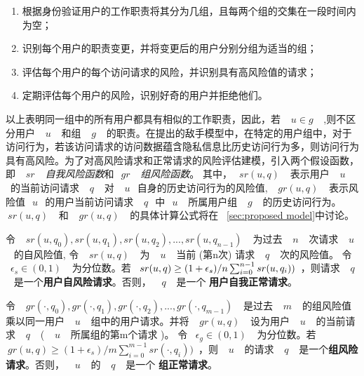 \begin{enumerate}
	\item 根据身份验证用户的工作职责将其分为几组，且每两个组的交集在一段时间内为空；
	\item 识别每个用户的职责变更，并将变更后的用户分别分组为适当的组；
	\item 评估每个用户的每个访问请求的风险，并识别具有高风险值的请求；
	\item 定期评估每个用户的风险，识别好奇的用户并拒绝他们。
\end{enumerate}

以上表明同一组中的所有用户都具有相似的工作职责，因此，若 ~$~u \in g~$~ ,则不区分用户 ~$~u~$~ 和组 ~$~g~$~ 的职责。在提出的敌手模型中，在特定的用户组中，对于访问行为，若该访问请求的访问数据蕴含隐私信息比历史访问行为多，则访问行为具有高风险。为了对高风险请求和正常请求的风险评估建模，引入两个假设函数，即 ~$~sr~$~ \emph{自我风险函数}和~$~gr~$~ \emph{组风险函数}。 其中，~$~sr(u,q)~$~ 表示用户 ~$~u~$~的当前访问请求 ~$~q~$~ 对 ~$~u~$~自身的历史访问行为的风险值,  ~$~gr(u,q)~$~ 表示风险值~$~u~$~的用户当前访问请求 ~$~q~$~中~$~u~$~ 所属用户组 ~$~g~$~ 的历史访问行为。~$~sr(u,q)~$~ 和 ~$~gr(u,q)~$~ 的具体计算公式将在 ~\ref{sec:proposed model}中讨论。

\begin{definition}%
	\label{def_self_risky}
	令 ~$~sr(u, q_0), sr(u, q_1), sr(u, q_2), ... ,sr(u, q_{n-1})~$~ 为过去 ~$~n~$~ 次请求 ~$~u~$~ 的自风险值, 令 ~$~sr(u,q)~$~ 为 ~$~u~$~ 当前 (第n次) 请求 ~$~q~$~ 次的风险值。 令 ~$\epsilon_s \in (0,1)~$~ 为分位数。若~$~sr(u,q) \geq  (1+\epsilon_s) / n  \sum ^{n-1}_{i=0}\\{sr(u,q_i))}$~，则请求 ~$~q~$~ 是一个\textbf{用户自风险请求}。否则， ~$~q~$~ 是一个 \textbf{用户自我正常请求}。
\end{definition}

\begin{definition}%
	\label{def_group_risky}
	令 ~$~gr(\cdot, q_0), gr(\cdot, q_1), gr(\cdot, q_2), ... , gr(\cdot, q_{m-1})~$~ 是过去 ~$~m~$~ 的组风险值乘以同一用户 ~$~u~$~ 组中的用户请求。并将 ~$~gr(u,q)~$~ 设为用户 ~$~u~$~ 的当前请求 ~$~q~$~  ( ~$~u~$~ 所属组的第m个请求 )。 令 ~$\epsilon_g \in (0,1)~$~ 为分位数。若~$~gr(u,q) \geq  (1+\epsilon_s) / m  \sum ^{m-1}_{i=0}{sr(\cdot,q_i))}$~，则 ~$~u~$~ 的请求 ~$~q~$~ 是一个\textbf{组风险请求}。否则， ~$~u~$~ 的 ~$~q~$~ 是一个 \textbf{组正常请求}。
\end{definition}


